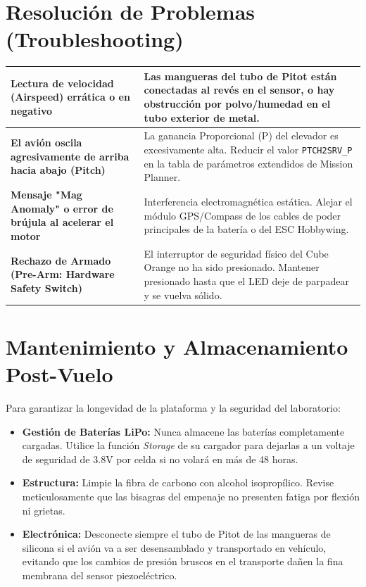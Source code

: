 \documentclass[11pt,a4paper]{article}
\begin{document}
\section{Resolución de Problemas (Troubleshooting)}
\renewcommand{\arraystretch}{1.5}
\begin{tabularx}{\textwidth}{|>{\columncolor{epnblue!5}\bfseries}p{4cm}|>{\raggedright\arraybackslash}X|}
\hline
Lectura de velocidad (Airspeed) errática o en negativo & Las mangueras del tubo de Pitot están conectadas al revés en el sensor, o hay obstrucción por polvo/humedad en el tubo exterior de metal. \\ \hline
El avión oscila agresivamente de arriba hacia abajo (Pitch) & La ganancia Proporcional (P) del elevador es excesivamente alta. Reducir el valor \texttt{PTCH2SRV\_P} en la tabla de parámetros extendidos de Mission Planner. \\ \hline
Mensaje "Mag Anomaly" o error de brújula al acelerar el motor & Interferencia electromagnética estática. Alejar el módulo GPS/Compass de los cables de poder principales de la batería o del ESC Hobbywing. \\ \hline
Rechazo de Armado (Pre-Arm: Hardware Safety Switch) & El interruptor de seguridad físico del Cube Orange no ha sido presionado. Mantener presionado hasta que el LED deje de parpadear y se vuelva sólido. \\ \hline
\end{tabularx}

\section{Mantenimiento y Almacenamiento Post-Vuelo}
Para garantizar la longevidad de la plataforma y la seguridad del laboratorio:
\begin{itemize}[itemsep=1ex]
    \item \textbf{Gestión de Baterías LiPo:} Nunca almacene las baterías completamente cargadas. Utilice la función \textit{Storage} de su cargador para dejarlas a un voltaje de seguridad de 3.8V por celda si no volará en más de 48 horas.
    \item \textbf{Estructura:} Limpie la fibra de carbono con alcohol isopropílico. Revise meticulosamente que las bisagras del empenaje no presenten fatiga por flexión ni grietas.
    \item \textbf{Electrónica:} Desconecte siempre el tubo de Pitot de las mangueras de silicona si el avión va a ser desensamblado y transportado en vehículo, evitando que los cambios de presión bruscos en el transporte dañen la fina membrana del sensor piezoeléctrico.
\end{itemize}
\end{document}
